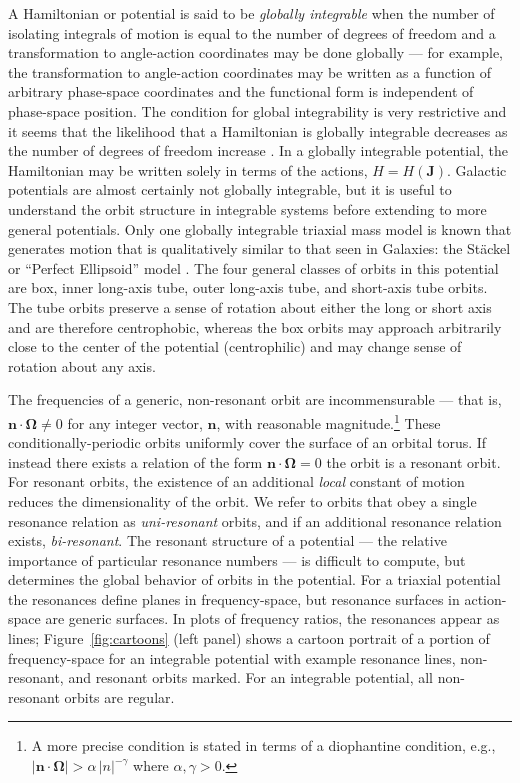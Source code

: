 \documentclass[letterpaper,12pt,preprint]{aastex}
\newcommand{\bs}[1]{\boldsymbol{#1}}
\begin{document}
A Hamiltonian or potential is said to be \emph{globally integrable} when the number of isolating integrals of motion is equal to the number of degrees of freedom and a transformation to angle-action coordinates may be done globally --- for example, the transformation to angle-action coordinates may be written as a function of arbitrary phase-space coordinates and the functional form is independent of phase-space position. The condition for global integrability is very restrictive and it seems that the likelihood that a Hamiltonian is globally integrable decreases as the number of degrees of freedom increase \citep[e.g.,][]{lichtenberg83}. In a globally integrable potential, the Hamiltonian may be written solely in terms of the actions, $H = H(\boldsymbol{J})$. Galactic potentials are almost certainly not globally integrable, but it is useful to understand the orbit structure in integrable systems before extending to more general potentials. Only one globally integrable triaxial mass model is known that generates motion that is qualitatively similar to that seen in Galaxies: the St\"ackel or ``Perfect Ellipsoid'' model \citep[e.g.,][]{kuzmin73, deZeeuw85}. The four general classes of orbits in this potential are box, inner long-axis tube, outer long-axis tube, and short-axis tube orbits. The tube orbits preserve a sense of rotation about either the long or short axis and are therefore centrophobic, whereas the box orbits may approach arbitrarily close to the center of the potential (centrophilic) and may change sense of rotation about any axis.

The frequencies of a generic, non-resonant orbit are incommensurable --- that is, $\bs{n} \cdot \bs{\Omega} \neq 0$ for any integer vector, $\bs{n}$, with reasonable magnitude.\footnote{A more precise condition is stated in terms of a diophantine condition, e.g., $|\bs{n} \cdot \boldsymbol{\Omega}| > \alpha \, |n|^{-\gamma}$ where $\alpha, \gamma>0$.} These conditionally-periodic orbits uniformly cover the surface of an orbital torus. If instead there exists a relation of the form $\boldsymbol{n} \cdot \boldsymbol{\Omega} = 0$ the orbit is a resonant orbit. For resonant orbits, the existence of an additional \emph{local} constant of motion reduces the dimensionality of the orbit. We refer to orbits that obey a single resonance relation as \emph{uni-resonant} orbits, and if an additional resonance relation exists, \emph{bi-resonant}. The resonant structure of a potential --- the relative importance of particular resonance numbers --- is difficult to compute, but determines the global behavior of orbits in the potential. For a triaxial potential the resonances define planes in frequency-space, but resonance surfaces in action-space are generic surfaces. In plots of frequency ratios, the resonances appear as lines; Figure~\ref{fig:cartoons} (left panel) shows a cartoon portrait of a portion of frequency-space for an integrable potential with example resonance lines, non-resonant, and resonant orbits marked. For an integrable potential, all non-resonant orbits are regular.
\end{document}
